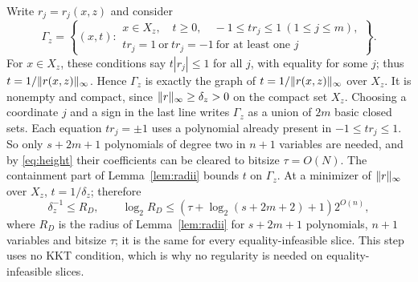 Write $r_j=r_j(x,z)$ and consider
\begin{equation}\label{eq:reciprocal}
 \Gamma_z=\left\{(x,t):\begin{array}{l}
 x\in X_z,\quad t\ge0,\quad -1\le tr_j\le1\ (1\le j\le m),\\
 tr_j=1\ \text{or}\ tr_j=-1\ \text{for at least one }j
 \end{array}\right\}.
\end{equation}
For $x\in X_z$, these conditions say $t|r_j|\le1$ for all $j$, with
equality for some $j$; thus $t=1/\lVert r(x,z)\rVert_\infty$. Hence $\Gamma_z$
is exactly the graph of $t=1/\lVert r(x,z)\rVert_\infty$ over $X_z$. It is
nonempty and compact, since $\lVert r\rVert_\infty\ge\delta_z>0$ on the
compact set $X_z$. Choosing a coordinate $j$ and a sign in the last line
writes $\Gamma_z$ as a union of $2m$ basic closed sets. Each equation
$tr_j=\pm1$ uses a polynomial already present in $-1\le tr_j\le1$. So
only $s+2m+1$ polynomials of degree two in $n+1$ variables are needed,
and by \eqref{eq:height} their coefficients can be cleared to bitsize
$\tau=O(N)$. The containment part of Lemma~\ref{lem:radii} bounds $t$ on
$\Gamma_z$. At a minimizer of $\lVert r\rVert_\infty$ over $X_z$, $t=1/\delta_z$;
therefore
\begin{equation}\label{eq:RD}
 \delta_z^{-1}\le R_D,\qquad
 \log_2 R_D\le(\tau+\log_2(s+2m+2)+1)2^{O(n)},
\end{equation}
where $R_D$ is the radius of Lemma~\ref{lem:radii} for $s+2m+1$
polynomials, $n+1$ variables and bitsize $\tau$; it is the same for every
equality-infeasible slice. This step uses no KKT condition, which is why
no regularity is needed on equality-infeasible slices.


